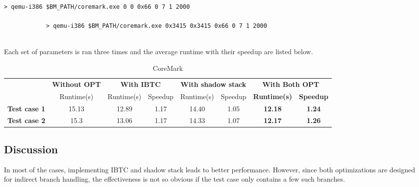\documentclass[12pt]{article}
\begin{document}
        \begin{lstlisting}[style=Shell]
            > qemu-i386 $BM_PATH/coremark.exe 0 0 0x66 0 7 1 2000
            
            > qemu-i386 $BM_PATH/coremark.exe 0x3415 0x3415 0x66 0 7 1 2000
        \end{lstlisting}
        ~\\
        Each set of parameters is ran three times and the average runtime with their speedup are listed below.
        \begin{table}[h!]
            \centering
            \caption{CoreMark}
            \label{my-label}
            \begin{tabular}{|c|c|c|c|c|c|c|c|}
                \hline
                & \textbf{Without OPT} & \multicolumn{2}{c|}{\textbf{With IBTC}} & \multicolumn{2}{c|}{\textbf{With shadow stack}} & \multicolumn{2}{c|}{{\color[HTML]{FE0000} \textbf{With Both OPT}}}                   \\ \cline{2-8} 
                \multirow{-2}{*}{\textbf{}} & Runtime(s)           & Runtime(s)           & Speedup          & Runtime(s)               & Speedup              & {\color[HTML]{FE0000} \textbf{Runtime(s)}} & {\color[HTML]{FE0000} \textbf{Speedup}} \\ \hline
                \textbf{Test case 1}         & 15.13                & 12.89                & 1.17             & 14.40                    & 1.05                 & {\color[HTML]{FE0000} \textbf{12.18}}      & {\color[HTML]{FE0000} \textbf{1.24}}    \\ \hline
                \textbf{Test case 2}         & 15.3                 & 13.06                & 1.17             & 14.33                    & 1.07                 & {\color[HTML]{FE0000} \textbf{12.17}}      & {\color[HTML]{FE0000} \textbf{1.26}}    \\ \hline
            \end{tabular}
        \end{table} 
    
    \subsection{Discussion}
        In most of the cases, implementing IBTC and shadow stack leads to better performance.
        However, since both optimizations are designed for indirect branch handling,
        the effectiveness is not so obvious if the test case only contains a few such branches.
 
\end{document}
